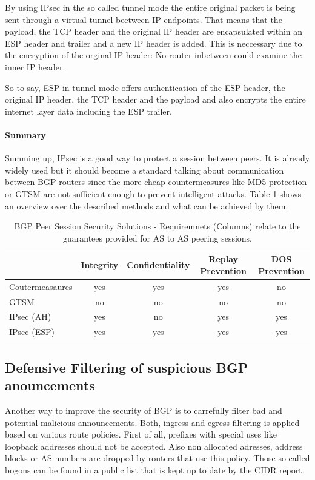 \documentclass[12pt,a4paper]{IEEEtran}
\begin{document}
		By using IPsec in the so called tunnel mode the entire original packet is being sent through a virtual tunnel beetween IP endpoints. That means that the payload, the TCP header and the original IP header are encapsulated within an ESP header and trailer and a new IP header is added. This is neccessary due to the encryption of the orginal IP header: No router inbetween could examine the inner IP header. 
		
		So to say, ESP in tunnel mode offers authentication of the ESP header, the original IP header, the TCP header and the payload and also encrypts the entire internet layer data including the ESP trailer. 


		\paragraph{Summary} Summing up, IPsec is a good way to protect a session between peers. It is already widely used but it should become a standard talking about  communication between BGP routers since the more cheap countermeasures like MD5 protection or GTSM are not sufficient enough to prevent intelligent attacks. Table \ref{tab:foo} shows an overview over the described methods and what can be achieved by them.

\begin{table}[t]
\centering
\begin{tabular}{ l c c c c }
\toprule
                &  Integrity   &  Confidentiality   &  Replay Prevention & DOS Prevention  \\
\midrule
Coutermeasaures  & yes & yes & yes & no \\
GTSM  & no & no & no & no \\
IPsec (AH)  & yes & no & yes & yes \\
IPsec (ESP)  & yes & yes & yes & yes \\
\bottomrule
\end{tabular}
\caption{BGP Peer Session Security Solutions - Requiremnets (Columns) relate to the guarantees provided for AS to AS peering sessions.}%
\label{tab:foo}
\end{table}

       \subsection{Defensive Filtering of suspicious BGP anouncements}

		Another way to improve the security of BGP is to carrefully filter bad and potential malicious announcements.
		Both, ingress and egress filtering is applied based on various route policies.
		First of all, prefixes with special uses like loopback addresses should not be accepted. 
		Also non allocated adresses, address blocks or AS numbers are dropped by routers that use this policy. Those so called bogons can be found in a public list that is kept up to date by the CIDR report. %
\end{document}
